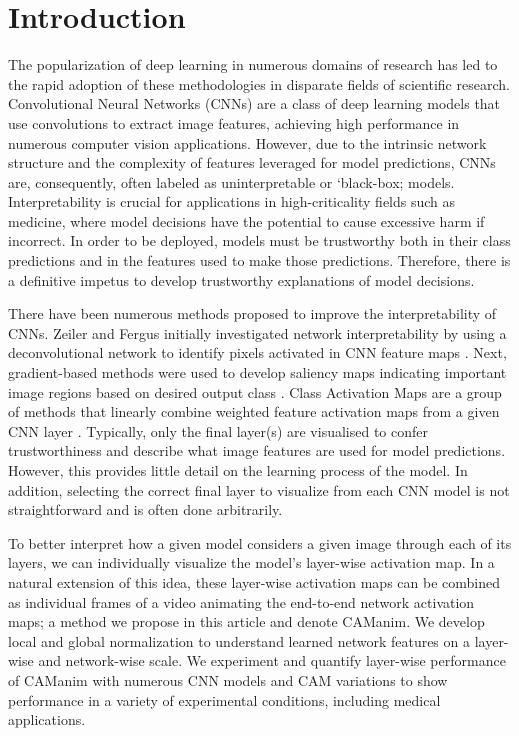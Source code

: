 \documentclass[10pt, conference, compsocconf]{IEEEtran}
\begin{document}
\section{Introduction}

The popularization of deep learning in numerous domains of research has led to the rapid adoption of these methodologies in disparate fields of scientific research. Convolutional Neural Networks (CNNs) are a class of deep learning models that use convolutions to extract image features, achieving high performance in numerous computer vision applications. However, due to the intrinsic network structure and the complexity of features leveraged for model predictions, CNNs are, consequently, often labeled as uninterpretable or `black-box; models. Interpretability is crucial for applications in high-criticality fields such as medicine, where model decisions have the potential to cause excessive harm if incorrect. In order to be deployed, models must be trustworthy both in their class predictions and in the features used to make those predictions. Therefore, there is a definitive impetus to develop trustworthy explanations of model decisions.

There have been numerous methods proposed to improve the interpretability of CNNs. Zeiler and Fergus initially investigated network interpretability by using a deconvolutional network to identify pixels activated in CNN feature maps \cite{zeiler2014visualizing}. Next, gradient-based methods were used to develop saliency maps indicating important image regions based on desired output class \cite{simonyan2013deep, springenberg2014striving, sundararajan2017axiomatic}. Class Activation Maps are a group of methods that linearly combine weighted feature activation maps from a given CNN layer \cite{zhou16,gradcam, gradcampp, Fu20, Gildenblat21, Draelos20, Jiang21, Wang20, Desai20, eigencam}. Typically, only the final layer(s) are visualised to confer trustworthiness and describe what image features are used for model predictions. However, this provides little detail on the learning process of the model. In addition, selecting the correct final layer to visualize from each CNN model is not straightforward and is often done arbitrarily. 

To better interpret how a given model considers a given image through each of its layers, we can individually visualize the model's layer-wise activation map. In a natural extension of this idea, these layer-wise activation maps can be combined as individual frames of a video animating the end-to-end network activation maps; a method we propose in this article and denote CAManim. We develop local and global normalization to understand learned network features on a layer-wise and network-wise scale. We experiment and quantify layer-wise performance of CAManim with numerous CNN models and CAM variations to show performance in a variety of experimental conditions, including medical applications. 
\end{document}
